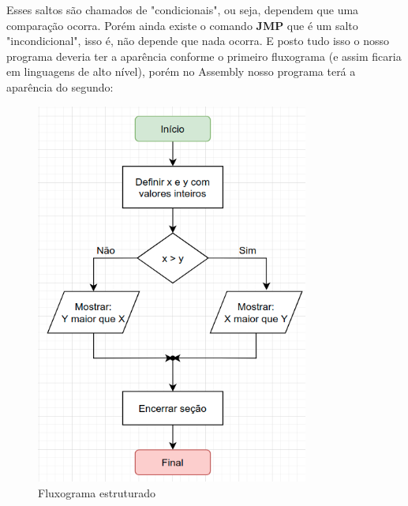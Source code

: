 Esses saltos são chamados de "condicionais", ou seja, dependem que uma comparação ocorra. Porém ainda existe o comando \textbf{JMP} que é um salto "incondicional", isso é, não depende que nada ocorra. E posto tudo isso o nosso programa deveria ter a aparência conforme o primeiro fluxograma (e assim ficaria em linguagens de alto nível), porém no Assembly nosso programa terá a aparência do segundo:
\begin{figure}[ht]
	\begin{minipage}[b]{0.45\linewidth}
		\centering
		\includegraphics[width=0.80\textwidth]{Pictures/cap01/programa13a}
		\caption{Fluxograma estruturado}
	\end{minipage}
	\hspace{0.5cm}
	\begin{minipage}[b]{0.45\linewidth}
		\centering

\end{minipage}
\end{figure}
